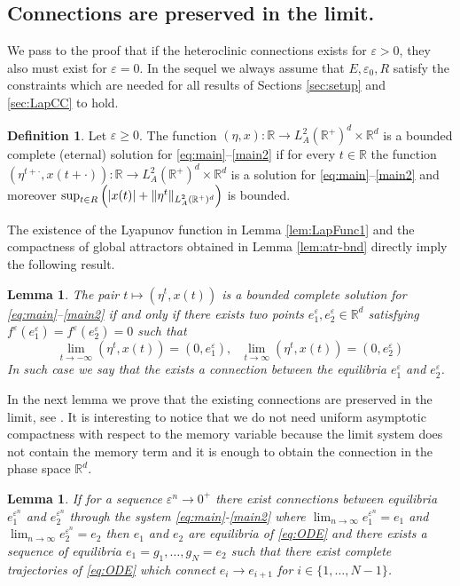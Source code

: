 \documentclass[11pt, leqno]{amsart}
\newtheorem{lem}[thm]{Lemma}
\theoremstyle{definition}
\newtheorem{df}[thm]{Definition}
\def\R{\mathbb{R}}
\begin{document}
\subsection{Connections are preserved in the limit.} We pass to the proof that if the heteroclinic connections exists for $\varepsilon>0$, they also must exist for $\varepsilon=0$. In the sequel we always assume that $E, \varepsilon_0, R$ satisfy the constraints which are needed for all results of Sections \ref{sec:setup} and \ref{sec:LapCC} to hold. 
\begin{df}
	Let $\varepsilon\geq 0$. The function $(\eta,x): \R \to L^2_A(\R^+)^d\times \R^d$ is a bounded complete (eternal) solution for \eqref{eq:main}--\eqref{main2} if for every $t\in \R$ the function $(\eta^{t+\cdot},x(t+\cdot)): \R \to L^2_A(\R^+)^d\times \R^d$ is a solution for \eqref{eq:main}--\eqref{main2}  and moreover $\sup_{t\in \mathbb \R}\left(|x(t)|+ \|\eta^t\|_{L^2_A(\R^+)^d}\right)$ is bounded.
\end{df}
The existence of the Lyapunov function in  Lemma \ref{lem:LapFunc1} and the  compactness of global attractors obtained in Lemma \ref{lem:atr-bnd} directly imply the following result.  \begin{lem}
	The pair $t\mapsto (\eta^t,x(t))$ is a bounded complete solution for \eqref{eq:main}--\eqref{main2} if and only if there exists two points $e^\varepsilon_1, e^\varepsilon_2 \in \mathbb{R}^d$ satisfying $f^\varepsilon(e^\varepsilon_1) = f^\varepsilon(e^\varepsilon_2) = 0$ such that
	$$
	\lim_{t\to -\infty} (\eta^t,x(t)) = (0,e^\varepsilon_1), \ \ \ 	\lim_{t\to \infty} (\eta^t,x(t)) = (0,e^\varepsilon_2)
	$$
	In such case we say that the exists a connection between the equilibria $e^\varepsilon_1$ and $e^\varepsilon_2$.
\end{lem}
In the next lemma we prove that the existing connections are preserved in the limit, see \cite[Proposition 4]{borto}. It is interesting to notice that we do not need uniform asymptotic compactness with respect to the memory variable because the limit system does not contain the memory term and it is enough to obtain the connection in the phase space $\R^d$.
\begin{lem}\label{lem:connection}
	If for a sequence $\varepsilon^n\to 0^+$ there exist connections between equilibria $e^{\varepsilon^n}_1$ and $e^{\varepsilon^n}_2$ through the system \eqref{eq:main}-\eqref{main2} where $\lim_{n\to\infty} e^{\varepsilon^n}_1 = e_1$ and $\lim_{n\to\infty} e^{\varepsilon^n}_2 = e_2$ then $e_1$ and $e_2$ are equilibria of \eqref{eq:ODE} and there exists a sequence of equilibria $e_1=g_1,\ldots, g_N=e_2$ such that there exist complete trajectories of \eqref{eq:ODE} which connect $e_i\to e_{i+1}$ for $i\in \{1,\ldots,N-1\}$.
\end{lem}
\end{document}
